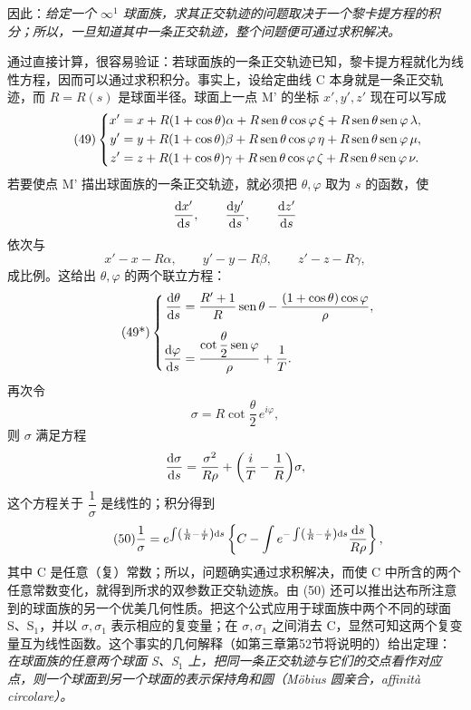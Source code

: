 因此：\emph{给定一个 \(\infty^1\) 球面族，求其正交轨迹的问题取决于一个黎卡提方程的积分；所以，一旦知道其中一条正交轨迹，整个问题便可通过求积解决。}

通过直接计算，很容易验证：若球面族的一条正交轨迹已知，黎卡提方程就化为线性方程，因而可以通过求积积分。事实上，设给定曲线 C 本身就是一条正交轨迹，而 \(R=R(s)\) 是球面半径。球面上一点 M' 的坐标 \(x',y',z'\) 现在可以写成
\begin{equation}\tag{49}
\left\{
\begin{aligned}
x'&=x+R(1+\cos\theta)\alpha+R\operatorname{sen}\theta\cos\varphi\,\xi+R\operatorname{sen}\theta\operatorname{sen}\varphi\,\lambda,\\
y'&=y+R(1+\cos\theta)\beta+R\operatorname{sen}\theta\cos\varphi\,\eta+R\operatorname{sen}\theta\operatorname{sen}\varphi\,\mu,\\
z'&=z+R(1+\cos\theta)\gamma+R\operatorname{sen}\theta\cos\varphi\,\zeta+R\operatorname{sen}\theta\operatorname{sen}\varphi\,\nu.
\end{aligned}\right.
\end{equation}
若要使点 M' 描出球面族的一条正交轨迹，就必须把 \(\theta,\varphi\) 取为 \(s\) 的函数，使
\[
\frac{\mathrm{d} x'}{\mathrm{d} s},
\qquad
\frac{\mathrm{d} y'}{\mathrm{d} s},
\qquad
\frac{\mathrm{d} z'}{\mathrm{d} s}
\]
依次与
\[
x'-x-R\alpha,
\qquad y'-y-R\beta,
\qquad z'-z-R\gamma,
\]
成比例。这给出 \(\theta,\varphi\) 的两个联立方程：
\begin{equation}\tag{49*}
\left\{
\begin{aligned}
\frac{\mathrm{d}\theta}{\mathrm{d} s}&=\frac{R'+1}{R}\operatorname{sen}\theta-\frac{(1+\cos\theta)\cos\varphi}{\rho},\\[0.4em]
\frac{\mathrm{d}\varphi}{\mathrm{d} s}&=\frac{\cot\dfrac{\theta}{2}\operatorname{sen}\varphi}{\rho}+\frac{1}{T}.
\end{aligned}\right.
\end{equation}
再次令
\[
\sigma=R\cot\frac{\theta}{2}\,e^{i\varphi},
\]
则 \(\sigma\) 满足方程
\[
\frac{\mathrm{d}\sigma}{\mathrm{d} s}=\frac{\sigma^2}{R\rho}+\biggl(\frac{i}{T}-\frac{1}{R}\biggr)\sigma,
\]
这个方程关于 \(\dfrac{1}{\sigma}\) 是线性的；积分得到
\begin{equation}\tag{50}
\frac{1}{\sigma}=e^{\int\left(\frac{1}{R}-\frac{i}{T}\right)\mathrm{d} s}
\left\{C-\int e^{-\int\left(\frac{1}{R}-\frac{i}{T}\right)\mathrm{d} s}\frac{\mathrm{d} s}{R\rho}\right\},
\end{equation}
其中 C 是任意（复）常数；所以，问题确实通过求积解决，而使 C 中所含的两个任意常数变化，就得到所求的双参数正交轨迹族。由 (50) 还可以推出达布所注意到的球面族的另一个优美几何性质。把这个公式应用于球面族中两个不同的球面 S、S\(_1\)，并以 \(\sigma,\sigma_1\) 表示相应的复变量；在 \(\sigma,\sigma_1\) 之间消去 C，显然可知这两个复变量互为线性函数。这个事实的几何解释（如第三章第52节将说明的）给出定理：
\emph{在球面族的任意两个球面 S、S\(_1\) 上，把同一条正交轨迹与它们的交点看作对应点，则一个球面到另一个球面的表示保持角和圆（Möbius 圆亲合，affinità circolare）。}

